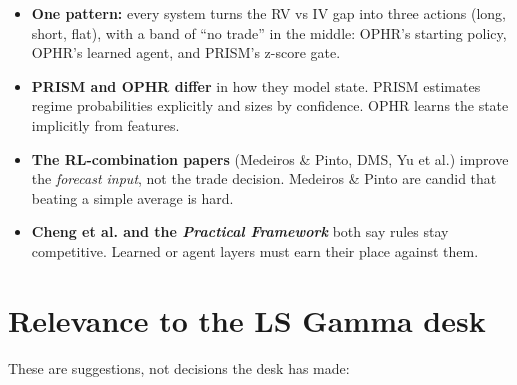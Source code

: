 \documentclass{article}
\begin{document}
\begin{itemize}

\item \textbf{One pattern:} every system turns the RV vs IV gap into three actions (long, short, flat), with a band of ``no trade'' in the middle: OPHR's starting policy, OPHR's learned agent, and PRISM's z-score gate.

\item \textbf{PRISM and OPHR differ} in how they model state. PRISM estimates regime probabilities explicitly and sizes by confidence. OPHR learns the state implicitly from features.

\item \textbf{The RL-combination papers} (Medeiros \& Pinto, DMS, Yu et al.) improve the \emph{forecast input}, not the trade decision. Medeiros \& Pinto are candid that beating a simple average is hard.

\item \textbf{Cheng et al. and the \emph{Practical Framework}} both say rules stay competitive. Learned or agent layers must earn their place against them.

\end{itemize}

\section{Relevance to the LS Gamma desk}

These are suggestions, not decisions the desk has made:
\end{document}
